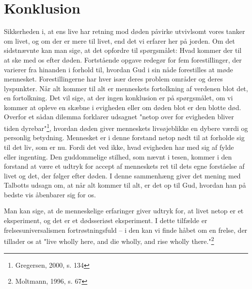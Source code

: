 \chapter{Konklusion}
Sikkerheden i, at ens live har retning mod døden påvirke utvivlsomt vores tanker om livet, og om der er mere til livet, end det vi erfarer her på jorden. Om det sidstnævnte kan man sige, at det opfordre til spørgsmålet: Hvad kommer der til at ske med os efter døden. Fortstående opgave redegør for fem forestillinger, der varierer fra hinanden i forhold til, hvordan Gud i sin nåde forestilles at møde mennesket. Forestillingerne har hver især deres problem områder og deres lyspunkter. Når alt kommer til alt er menneskets fortolkning af verdenen blot det, en fortolkning. Det vil sige, at der ingen konklusion er på spørgsmålet, om vi kommer at opleve en skæbne i evigheden eller om døden blot er den blotte død. Overfor et sådan dilemma forklarer udsagnet "netop over for evigheden bliver tiden dyrebar"\footnote{Gregersen, 2000, s. 134}, hvordan døden giver menneskets livsøjeblikke en dybere værdi og personlig betydning. Mennesket er i denne forstand netop nødt til at forholde sig til det liv, som er nu. Fordi det ved ikke, hvad evigheden har med sig af fylde eller ingenting. Den guddommelige stilhed, som nævnt i tesen, kommer i den forstand at være et udtryk for accept af menneskets ret til dets egne forståelse af livet og det, der følger efter døden. I denne sammenhæng giver det mening med Talbotts udsagn om, at når alt kommer til alt, er det op til Gud, hvordan han på bedste vis åbenbarer sig for os. 

Man kan sige, at de menneskelige erfaringer giver udtryk for, at livet netop er et eksperiment, og det er et dødsseriøst eksperiment. I dette tilfælde er frelsesuniversalismen fortrøstningsfuld -- i den kan vi finde håbet om en frelse, der tillader os at "live wholly here, and die wholly, and rise wholly there."\footnote{Moltmann, 1996, s. 67}